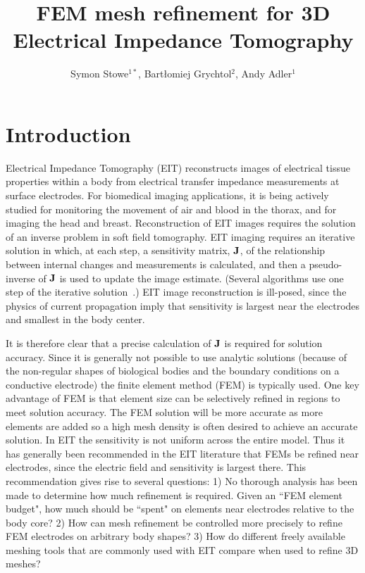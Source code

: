 \documentclass[12pt]{iopart}
\begin{document}
\title{%
FEM mesh refinement for 3D Electrical Impedance Tomography %
}

 \author{%
Symon Stowe$^{1*}$,
Bart\l{}omiej Grychtol$^2$,
Andy Adler$^1$}

\address{
$^1$Systems and Computer Engineering, Carleton University, Ottawa, Canada
$^2$OTHER
}
\vspace{10pt}

\begin{abstract}

\end{abstract}

\section{Introduction}

Electrical Impedance Tomography (EIT) reconstructs images of 
electrical tissue properties within a body from electrical
transfer impedance measurements at surface electrodes. For
biomedical imaging applications, it is being actively studied
for monitoring
the movement of air and blood in the thorax, and for imaging
the head and breast. Reconstruction of EIT images requires
the solution of an inverse problem in soft field tomography.
EIT imaging requires an iterative solution in which, at each step,
a sensitivity matrix, $\bf J$, of
the relationship between internal changes and measurements
is calculated, and then a pseudo-inverse of $\bf J$ is used
to update the image estimate. (Several algorithms use
one step of the iterative solution~\parencite{lionheart_eit_2004}.)
EIT image reconstruction is ill-posed, since the physics of
current propagation imply that sensitivity is largest near
the electrodes and smallest in the body center.

It is therefore clear that a precise  calculation of $\bf J$ is
required for solution accuracy. Since it is generally not
possible to use analytic solutions (because of the non-regular
shapes of biological bodies and the boundary conditions on a
conductive electrode) the finite element method (FEM) is typically
used. 
One key advantage of FEM is that element size can be
selectively refined in regions to meet solution accuracy. 
The FEM solution will be more accurate as more elements are
added so a high mesh density is often desired to achieve an 
accurate solution. In EIT the sensitivity is not uniform 
across the entire model.
Thus
it has generally been recommended in the EIT literature 
that FEMs be refined near electrodes, since the electric
field and sensitivity is largest there. 
This recommendation gives rise to several questions: 
1) No thorough analysis has been made to determine how much 
refinement is required. Given an ``FEM element budget", how
much should be ``spent" on elements near electrodes relative to 
the body core?
2) How can mesh refinement be controlled more precisely 
to refine FEM electrodes on arbitrary
body shapes? 
3) How do different freely available meshing tools that are
commonly used with EIT compare when used to refine 3D meshes?
\end{document}
